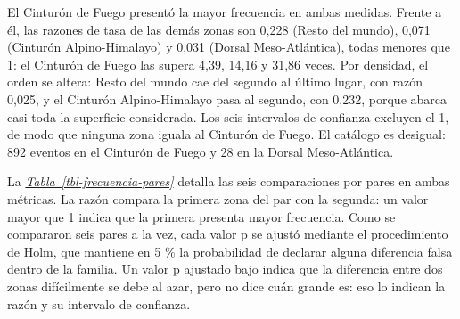 \documentclass[
  spanish,
  letterpaper,
  DIV=11,
  numbers=noendperiod]{scrartcl}
\newcommand{\asesoriaStyledRef}[1]{%
  {\hypersetup{linkcolor=asesoriaLinkColor,urlcolor=asesoriaLinkColor,citecolor=asesoriaLinkColor}\textcolor{asesoriaLinkColor}{\emph{#1}}}%
}
\newcommand{\asesoriaTableLink}[1]{\hyperref[#1]{Tabla~\ref*{#1}}}
\newcommand{\asesoriaTableRef}[1]{\asesoriaStyledRef{\asesoriaTableLink{#1}}}
\begin{document}
El Cinturón de Fuego presentó la mayor frecuencia en ambas medidas.
Frente a él, las razones de tasa de las demás zonas son 0,228 (Resto del
mundo), 0,071 (Cinturón Alpino-Himalayo) y 0,031 (Dorsal
Meso-Atlántica), todas menores que 1: el Cinturón de Fuego las supera
4,39, 14,16 y 31,86 veces. Por densidad, el orden se altera: Resto del
mundo cae del segundo al último lugar, con razón 0,025, y el Cinturón
Alpino-Himalayo pasa al segundo, con 0,232, porque abarca casi toda la
superficie considerada. Los seis intervalos de confianza excluyen el 1,
de modo que ninguna zona iguala al Cinturón de Fuego. El catálogo es
desigual: 892 eventos en el Cinturón de Fuego y 28 en la Dorsal
Meso-Atlántica.

La \asesoriaTableRef{tbl-frecuencia-pares} detalla las seis
comparaciones por pares en ambas métricas. La razón compara la primera
zona del par con la segunda: un valor mayor que 1 indica que la primera
presenta mayor frecuencia. Como se compararon seis pares a la vez, cada
valor p se ajustó mediante el procedimiento de Holm, que mantiene en 5
\% la probabilidad de declarar alguna diferencia falsa dentro de la
familia. Un valor p ajustado bajo indica que la diferencia entre dos
zonas difícilmente se debe al azar, pero no dice cuán grande es: eso lo
indican la razón y su intervalo de confianza.

\begingroup
\scriptsize
\centering
\setlength{\tabcolsep}{2.0pt}
\renewcommand{\arraystretch}{0.90}
{}
\label{tbl-frecuencia-pares}
\hypertarget{dest-tbl-frecuencia-pares}{}
\par\vspace{-0.7em}
\endgroup
\end{document}
